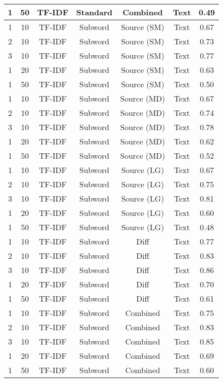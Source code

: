\begin{longtable}{|c|c|c|c|c|c|c|}
\hline
1 & 50 & TF-IDF & Standard & Combined & Text & 0.49 \\
\hline
1 & 10 & TF-IDF & Subword & Source (SM) & Text & 0.67 \\
\hline
2 & 10 & TF-IDF & Subword & Source (SM) & Text & 0.73 \\
\hline
3 & 10 & TF-IDF & Subword & Source (SM) & Text & 0.77 \\
\hline
1 & 20 & TF-IDF & Subword & Source (SM) & Text & 0.63 \\
\hline
1 & 50 & TF-IDF & Subword & Source (SM) & Text & 0.50 \\
\hline
1 & 10 & TF-IDF & Subword & Source (MD) & Text & 0.67 \\
\hline
2 & 10 & TF-IDF & Subword & Source (MD) & Text & 0.74 \\
\hline
3 & 10 & TF-IDF & Subword & Source (MD) & Text & 0.78 \\
\hline
1 & 20 & TF-IDF & Subword & Source (MD) & Text & 0.62 \\
\hline
1 & 50 & TF-IDF & Subword & Source (MD) & Text & 0.52 \\
\hline
1 & 10 & TF-IDF & Subword & Source (LG) & Text & 0.67 \\
\hline
2 & 10 & TF-IDF & Subword & Source (LG) & Text & 0.75 \\
\hline
3 & 10 & TF-IDF & Subword & Source (LG) & Text & 0.81 \\
\hline
1 & 20 & TF-IDF & Subword & Source (LG) & Text & 0.60 \\
\hline
1 & 50 & TF-IDF & Subword & Source (LG) & Text & 0.48 \\
\hline
1 & 10 & TF-IDF & Subword & Diff & Text & 0.77 \\
\hline
2 & 10 & TF-IDF & Subword & Diff & Text & 0.83 \\
\hline
3 & 10 & TF-IDF & Subword & Diff & Text & 0.86 \\
\hline
1 & 20 & TF-IDF & Subword & Diff & Text & 0.70 \\
\hline
1 & 50 & TF-IDF & Subword & Diff & Text & 0.61 \\
\hline
1 & 10 & TF-IDF & Subword & Combined & Text & 0.75 \\
\hline
2 & 10 & TF-IDF & Subword & Combined & Text & 0.83 \\
\hline
3 & 10 & TF-IDF & Subword & Combined & Text & 0.85 \\
\hline
1 & 20 & TF-IDF & Subword & Combined & Text & 0.69 \\
\hline
1 & 50 & TF-IDF & Subword & Combined & Text & 0.60 \\

\end{longtable}
